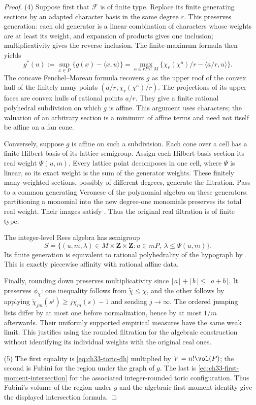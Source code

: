\begin{proof}
(4)  Suppose first that $\mathcal F$ is of finite type.
Replace its finite generating sections by an adapted character basis
in the same degree $r$.  This preserves generation: each old generator
is a linear combination of characters whose weights are at least its
weight, and expansion of products gives one inclusion; multiplicativity
gives the reverse inclusion.  The finite-maximum formula then yields
\[
 g^\ast(u):=\sup_{x\in P}\{g(x)-\langle x,u\rangle\}
 =\max_{a\in rP\cap M}
       \{\chi_r(\chi^a)/r-\langle a/r,u\rangle\}.
\]
The concave Fenchel--Moreau formula recovers $g$ as the upper roof
of the convex hull of the finitely many points
$(a/r,\chi_r(\chi^a)/r)$.  The projections of its upper faces are
convex hulls of rational points $a/r$.  They give a finite rational
polyhedral subdivision on which $g$ is affine.  This argument uses
characters; the valuation of an arbitrary section is a minimum of
affine terms and need not itself be affine on a fan cone.

Conversely, suppose $g$ is affine on such a subdivision.  Each cone
over a cell has a finite Hilbert basis of its lattice semigroup.
Assign each Hilbert-basis section its real weight $\Psi(u,m)$.
Every lattice point decomposes in one cell, where $\Psi$ is linear,
so its exact weight is the sum of the generator weights.  These
finitely many weighted sections, possibly of different degrees,
generate the filtration.  Pass to a common generating Veronese of
the polynomial algebra on these generators: partitioning a monomial
into the new degree-one monomials preserves its total real weight.
Their images satisfy .  Thus the original
real filtration is of finite type.

The integer-level Rees algebra has semigroup
\[
 S=\{(u,m,\lambda)\in M\times\mathbf Z\times\mathbf Z:
                 u\in mP,\ \lambda\leq\Psi(u,m)\}.
\]
Its finite generation is equivalent to rational polyhedrality of the
hypograph by .  This is exactly
piecewise affinity with rational affine data.

Finally, rounding down preserves multiplicativity since
$\lfloor a\rfloor+\lfloor b\rfloor\leq\lfloor a+b\rfloor$.
It preserves $\phi_\chi$: one inequality follows from
$\widetilde\chi\leq\chi$, and the other follows by applying
$\widetilde\chi_{jm}(s^j)\geq j\chi_m(s)-1$ and sending $j\to\infty$.
The ordered jumping lists differ by at most one before normalization,
hence by at most $1/m$ afterwards.  Their uniformly supported empirical
measures have the same weak limit.  This justifies using the rounded
filtration for the algebraic construction without identifying its
individual weights with the original real ones.

(5)  The first equality is \eqref{eq:ch33-toric-dh} multiplied by
$V=n!\vol(P)$; the second is Fubini for the region under the graph of
$g$.  The last is
\eqref{eq:ch33-first-moment-intersection} for the associated
integer-rounded toric configuration.  Thus Fubini's volume of the
region under $g$ and the algebraic first-moment identity give the
displayed intersection formula.
\end{proof}

